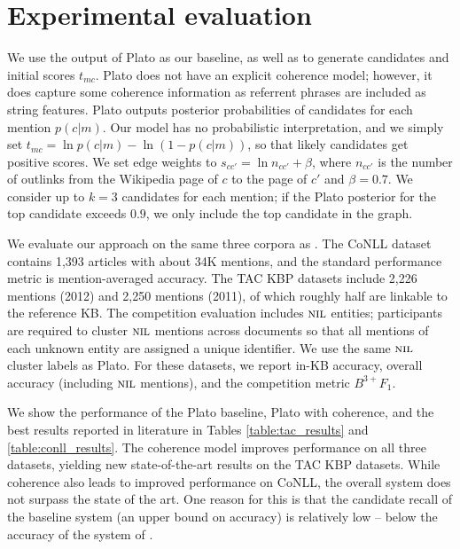 \section{Experimental evaluation}

We use the output of Plato \cite{Lazic2015} as our baseline, as well as to generate candidates and initial scores $t_{mc}$. Plato does not have an explicit coherence model; however, it does capture some coherence information as referrent phrases are included as string features. Plato outputs posterior probabilities of candidates for each mention $p(c|m)$. Our model has no probabilistic interpretation, and we simply set $t_{mc} = \ln p(c|m) - \ln (1 - p(c|m))$, so that likely candidates get positive scores. We set edge weights to $s_{cc'} = \ln n_{cc'} + \beta$, where $n_{cc'}$ is the number of outlinks from the Wikipedia page of $c$ to the page of $c'$ and $\beta=0.7$. We consider up to $k=3$ candidates for each mention; if the Plato posterior for the top candidate exceeds $0.9$, we only include the top candidate in the graph.

We evaluate our approach on the same three corpora as . The CoNLL dataset ~\cite{Hachey2013130} contains 1,393 articles with about 34K
mentions, and the standard performance metric is mention-averaged accuracy.
The TAC KBP datasets \cite{TAC2011,TAC2012} include 2,226 mentions (2012) and 2,250 mentions (2011), of which roughly half are linkable to the reference KB. The competition evaluation includes $\mbox{\textsc{nil}}$ entities;
participants are required to cluster $\mbox{\textsc{nil}}$ mentions across documents
so that all mentions of each unknown entity are assigned a unique
identifier. We use the same $\mbox{\textsc{nil}}$ cluster labels as Plato. For these datasets, we report in-KB accuracy, overall accuracy (including $\mbox{\textsc{nil}}$ mentions), and the competition metric $B^{3+} F_1$. 

We show the performance of the Plato baseline, Plato with coherence, and the best results reported in literature in Tables \ref{table:tac_results} and \ref{table:conll_results}.  The coherence model improves performance on all three datasets, yielding new state-of-the-art results on the TAC KBP datasets. While coherence also leads to improved performance on CoNLL, the overall system does not surpass the state of the art. One reason for this is that the candidate recall of the baseline system (an upper bound on accuracy) is relatively low -- below the accuracy of the system of \cite{Pershina2015}. 


